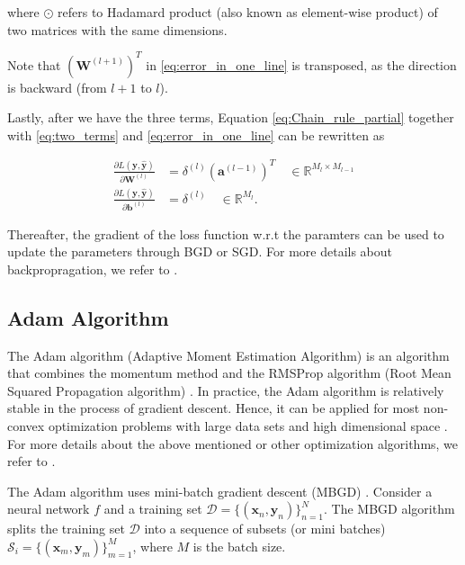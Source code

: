 \documentclass[
	parskip, 			   %
	twoside, 			   %
	DIV=14, 			   %
	BCOR=15.0mm, 		   %
	headsepline, 		   %
	open=right, 		   %
	captions=tableheading, %
	bibliography=totoc,    %
	numbers=noenddot       %
]{scrreprt}
\begin{document}
where $\odot$ refers to Hadamard product (also known as element-wise product) of two matrices with the same dimensions.

Note that $(\mathbf{W}^{(l+1)})^T$ in \ref{eq:error_in_one_line} is transposed, as the direction is backward (from $l+1$ to $l$).

Lastly, after we have the three terms, Equation \ref{eq:Chain_rule_partial} together with \ref{eq:two_terms} and \ref{eq:error_in_one_line} can be rewritten as

\begin{equation}
    \label{eq:Chain_rule_partial_deducted}
    \begin{aligned}
        \frac{\partial L\left( \mathbf{y}, \hat{\mathbf{y}} \right)}{\partial \mathbf{W}^{(l)}} &= \delta^{(l)} (\mathbf{a}^{(l-1)})^T \quad \in \mathbb{R}^{M_{l} \times M_{l-1}}
        \\
        \frac{\partial L\left( \mathbf{y}, \hat{\mathbf{y}} \right)}{\partial \mathbf{b}^{(l)}} &= \delta^{(l)} \quad \in \mathbb{R}^{M_{l}}.
    \end{aligned}
\end{equation}

Thereafter, the gradient of the loss function w.r.t the paramters can be used to update the parameters through BGD or SGD. For more details about backpropragation, we refer to \cite{nielsen2015neural}.

\subsection{Adam Algorithm}
The Adam algorithm (Adaptive Moment Estimation Algorithm) \cite{kingma2014adam} is an algorithm that combines the momentum method \cite{qian1999momentum} and the RMSProp algorithm (Root Mean Squared Propagation algorithm) \cite{tieleman2012divide}. In practice, the Adam algorithm is relatively stable in the process of gradient descent. Hence, it can be applied for most non-convex optimization problems with large data sets and high dimensional space \cite{sun2019survey}. For more details about the above mentioned or other optimization algorithms, we refer to \cite{ruder2016overview}.

The Adam algorithm uses mini-batch gradient descent (MBGD) \cite{bottou2010large}. Consider a neural network $f$ and a training set $\mathcal{D}=\{ (\mathbf{x}_{n}, \mathbf{y}_{n}) \}_{n=1}^{N}$. The MBGD algorithm splits the training set $\mathcal{D}$ into a sequence of subsets (or mini batches) $\mathcal{S}_i=\{(\mathbf{x}_{m}, \mathbf{y}_{m}) \}_{m=1}^{M}$, where $M$ is the batch size.
\end{document}
